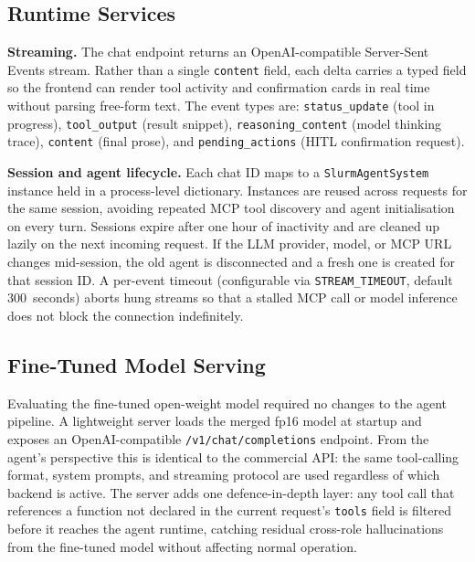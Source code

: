 \subsection{Runtime Services}

\textbf{Streaming.} The chat endpoint returns an OpenAI-compatible Server-Sent Events stream. Rather than a single \texttt{content} field, each delta carries a typed field so the frontend can render tool activity and confirmation cards in real time without parsing free-form text. The event types are: \texttt{status\_update} (tool in progress), \texttt{tool\_output} (result snippet), \texttt{reasoning\_content} (model thinking trace), \texttt{content} (final prose), and \texttt{pending\_actions} (HITL confirmation request).

\textbf{Session and agent lifecycle.} Each chat ID maps to a \texttt{SlurmAgentSystem} instance held in a process-level dictionary. Instances are reused across requests for the same session, avoiding repeated MCP tool discovery and agent initialisation on every turn. Sessions expire after one hour of inactivity and are cleaned up lazily on the next incoming request. If the LLM provider, model, or MCP URL changes mid-session, the old agent is disconnected and a fresh one is created for that session ID. A per-event timeout (configurable via \texttt{STREAM\_TIMEOUT}, default 300~seconds) aborts hung streams so that a stalled MCP call or model inference does not block the connection indefinitely.

\subsection{Fine-Tuned Model Serving}

Evaluating the fine-tuned open-weight model required no changes to the agent pipeline. A lightweight server loads the merged fp16 model at startup and exposes an OpenAI-compatible \texttt{/v1/chat/completions} endpoint. From the agent's perspective this is identical to the commercial API: the same tool-calling format, system prompts, and streaming protocol are used regardless of which backend is active. The server adds one defence-in-depth layer: any tool call that references a function not declared in the current request's \texttt{tools} field is filtered before it reaches the agent runtime, catching residual cross-role hallucinations from the fine-tuned model without affecting normal operation.
